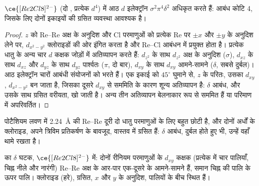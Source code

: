 \begin{proposition}\label{prop:b3:organometallic-bonding:quadruple}
$\ce{[Re2Cl8]^{2-}}$ (दो , प्रत्येक $d^4$) में आठ $d$ इलेक्ट्रॉन $\sigma^2\pi^4\delta^2$ अधिकृत करते हैं: आबंध
कोटि 4, जिसके लिए दोनों  इकाइयों की ग्रसित व्यवस्था आवश्यक है।
\end{proposition}

\begin{proof}
$z$ को Re--Re अक्ष के अनुदिश और Cl परमाणुओं को प्रत्येक Re पर $\pm x$ और $\pm y$ के अनुदिश लेने पर, $d_{x^2-y^2}$
क्लोराइडों की ओर इंगित करता है और Re--Cl आबंधन में प्रयुक्त होता है। प्रत्येक धातु के अन्य चार $d$ कक्षक
जोड़ों में अतिव्यापन करते हैं: $d_{z^2}$ के साथ $d_{z^2}$ अक्ष के अनुदिश ($\sigma$), $d_{xz}$ के साथ $d_{xz}$ और $d_{yz}$
के साथ $d_{yz}$ पार्श्वतः ($\pi$, दो बार), $d_{xy}$ के साथ $d_{xy}$ आमने-सामने ($\delta$, सबसे दुर्बल)।
आठ इलेक्ट्रॉन चारों आबंधी संयोजनों को भरते हैं। एक इकाई को $45^\circ$ घुमाने से,
$z$ के परितः, उसका $d_{xy}$, $d_{x^2-y^2}$ बन जाता है, जिसका दूसरे $d_{xy}$ से सममिति के कारण
शून्य अतिव्यापन है: $\delta$ आबंध, और उसके साथ ग्रसित वरीयता, खो जाती है। अन्य
तीन अतिव्यापन बेलनाकार रूप से सममित हैं या परिमाण में अपरिवर्तित।
\end{proof}

पोटैशियम लवण में \qty{2.24}{\angstrom} की Re--Re दूरी दो धातु परमाणुओं के लिए बहुत छोटी है, और दोनों अर्धों के क्लोराइड, अपने त्रिविम प्रतिकर्षण के बावजूद,
वास्तव में ग्रसित हैं: $\delta$ आबंध, दुर्बल होते हुए भी, उन्हें वहाँ थामे रखता है।

\begin{omfigure}

{\small {} का $\delta$ घटक, $\ce{[Re2Cl8]^{2-}}$ में: दोनों रीनियम परमाणुओं के $d_{xy}$ कक्षक
(प्रत्येक में चार पालियाँ, चिह्न नीले और नारंगी) Re--Re अक्ष के आर-पार एक-दूसरे के आमने-सामने हैं,
समान चिह्न की पालि के ऊपर पालि। क्लोराइड (हरे),
ग्रसित, $x$ और $y$ के अनुदिश, पालियों के बीच स्थित हैं।}
\end{omfigure}

